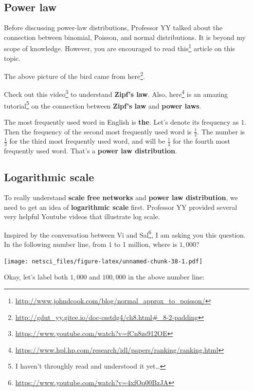 \documentclass[
]{krantz}
\makeatletter
\renewcommand{\href}[2]{#2\footnote{\url{#1}}}
\newenvironment{kframe}{%
\medskip{}
\setlength{\fboxsep}{.8em}
 \def\at@end@of@kframe{}%
 \ifinner\ifhmode%
  \def\at@end@of@kframe{\end{minipage}}%
  \begin{minipage}{\columnwidth}%
 \fi\fi%
 \def\FrameCommand##1{\hskip\@totalleftmargin \hskip-\fboxsep
 \colorbox{shadecolor}{##1}\hskip-\fboxsep
     \hskip-\linewidth \hskip-\@totalleftmargin \hskip\columnwidth}%
 \MakeFramed {\advance\hsize-\width
   \@totalleftmargin\z@ \linewidth\hsize
   \@setminipage}}%
 {\par\unskip\endMakeFramed%
 \at@end@of@kframe}
\newenvironment{rmdblock}[1]
  {
  \begin{itemize}
  \renewcommand{\labelitemi}{
    \raisebox{-.7\height}[0pt][0pt]{
      {\setkeys{Gin}{width=3em,keepaspectratio}\texttt{[image: images/\#1]}}
    }
  }
  \setlength{\fboxsep}{1em}
  \begin{kframe}
  \item
  }
  {
  \end{kframe}
  \end{itemize}
  }
\newenvironment{rmdreminder}
  {\begin{rmdblock}{reminder}}
  {\end{rmdblock}}
\makeatother
\begin{document}
\hypertarget{power-law}{%
\subsection{Power law}\label{power-law}}

\begin{rmdreminder}
Before discussing power-law distributions, Professor YY talked about the connection between binomial, Poisson, and normal distributions. It is beyond my scope of knowledge. However, you are encouraged to read \href{http://www.johndcook.com/blog/normal_approx_to_poisson/}{this} article on this topic.
\end{rmdreminder}

The above picture of the bird came from \href{http://gdut_yy.gitee.io/doc-csstdg4/ch8.html\#_8-2-padding}{here}.

Check out \href{https://www.youtube.com/watch?v=fCn8zs912OE}{this video} to understand \textbf{Zipf's law}. Also, \href{https://www.hpl.hp.com/research/idl/papers/ranking/ranking.html}{here} is an amazing tutorial\footnote{I haven't throughly read and understood it yet\ldots{}} on the connection between \textbf{Zipf's law} and \textbf{power laws}.

The most frequently used word in English is \textbf{the}. Let's denote its frequency as \(1\). Then the frequency of the second most frequently used word is \(\frac{1}{2}\). The number is \(\frac{1}{3}\) for the third most frequently used word, and will be \(\frac{1}{4}\) for the fourth most frequently used word. That's a \textbf{power law distribution}.

\hypertarget{logarithmic-scale}{%
\subsection{Logarithmic scale}\label{logarithmic-scale}}

To really understand \textbf{scale free networks} and \textbf{power law distribution}, we need to get an idea of \textbf{logarithmic scale} first. Professor YY provided several very helpful Youtube videos that illustrate log scale.

Inspired by \href{https://www.youtube.com/watch?v=4xfOq00BzJA}{the conversation between Vi and Sal}, I am asking you this question. In the following number line, from \(1\) to 1 million, where is \(1,000\)?

\texttt{[image: netsci\_files/figure-latex/unnamed-chunk-38-1.pdf]}

Okay, let's label both \(1,000\) and \(100,000\) in the above number line:
\end{document}
